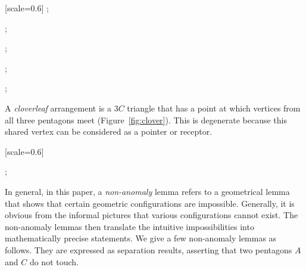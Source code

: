 {
[scale=0.6]
;
\begin{scope}[xshift=4.5cm,yshift=1.5cm]
;
\end{scope}
\begin{scope}[xshift=8cm]
;
\end{scope}
\begin{scope}[xshift=12cm]
;
\end{scope}
\begin{scope}[xshift=16cm]
;
\end{scope}
}





A {\it cloverleaf} arrangement is a $3C$ triangle that has a point at
which vertices from all three pentagons meet
(Figure~\ref{fig:clover}).  This is degenerate because this shared
vertex can be considered as a pointer or receptor.

{
[scale=0.6]
\begin{scope}[xshift=4cm]
;
\end{scope}
}


In general, in this paper, a {\it non-anomaly} lemma refers to a
geometrical lemma that shows that certain geometric configurations are
impossible.  Generally, it is obvious from the informal pictures that
various configurations cannot exist.  The non-anomaly lemmas then
translate the intuitive impossibilities into mathematically precise
statements.  We give a few non-anomaly lemmas as follows.
They are expressed as separation results, asserting that
two pentagons $A$ and $C$ do not touch.

